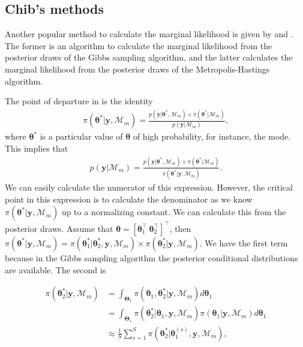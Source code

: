 \subsection{Chib's methods}\label{sec10_4_2}

Another popular method to calculate the marginal likelihood is given by \cite{chib1995marginal} and \cite{chib2001marginal}. The former is an algorithm to calculate the marginal likelihood from the posterior draws of the Gibbs sampling algorithm, and the latter calculates the marginal likelihood from the posterior draws of the Metropolis-Hastings algorithm.

The point of departure in \cite{chib1995marginal} is the identity
\begin{align*}
	\pi(\bm{\theta}^*|\bm{y},\mathcal{M}_m)=\frac{p(\bm{y}|\bm{\theta}^*,\mathcal{M}_m)\times\pi(\bm{\theta}^*|\mathcal{M}_m)}{p(\bm{y}|\mathcal{M}_m)},
\end{align*} 
where $\bm{\theta}^*$ is a particular value of $\bm{\theta}$ of high probability, for instance, the mode. This implies that
\begin{align*}
	p(\bm{y}|\mathcal{M}_m)=\frac{p(\bm{y}|\bm{\theta}^*,\mathcal{M}_m)\times\pi(\bm{\theta}^*|\mathcal{M}_m)}{\pi(\bm{\theta}^*|\bm{y},\mathcal{M}_m)}.
\end{align*} 
We can easily calculate the numerator of this expression. However, the critical point in this expression is to calculate the denominator as we know $\pi(\bm{\theta}^*|\bm{y},\mathcal{M}_m)$ up to a normalizing constant. We can calculate this from the posterior draws. Assume that $\bm{\theta}=[\bm{\theta}^{\top}_1 \ \bm{\theta}^{\top}_2]^{\top}$, then $\pi(\bm{\theta}^*|\bm{y},\mathcal{M}_m)=\pi(\bm{\theta}^*_1|\bm{\theta}^*_2,\bm{y},\mathcal{M}_m)\times \pi(\bm{\theta}^*_2|\bm{y},\mathcal{M}_m)$. We have the first term because in the Gibbs sampling algorithm the posterior conditional distributions are available. The second is

\begin{align*}
	\pi(\bm{\theta}^*_2|\bm{y},\mathcal{M}_m)&=\int_{\bm{\Theta}_1}\pi(\bm{\theta}_1,\bm{\theta}^*_2|\bm{y},\mathcal{M}_m)d\bm{\theta}_1\\
	&=\int_{\bm{\Theta}_1}\pi(\bm{\theta}^*_2|\bm{\theta}_1,\bm{y},\mathcal{M}_m)\pi(\bm{\theta}_1|\bm{y},\mathcal{M}_m)d\bm{\theta}_1\\
	&\approx \frac{1}{S}\sum_{s=1}^S \pi(\bm{\theta}^*_2|\bm{\theta}^{(s)}_1,\bm{y},\mathcal{M}_m),
\end{align*} 

